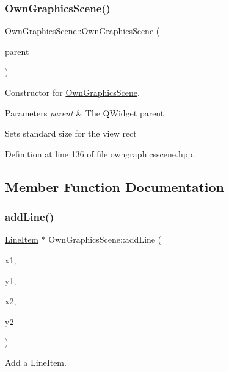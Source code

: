 \subsubsection{\texorpdfstring{Own\+Graphics\+Scene()}{OwnGraphicsScene()}}
{\footnotesize\ttfamily Own\+Graphics\+Scene\+::\+Own\+Graphics\+Scene (\begin{DoxyParamCaption}\item[{Q\+Widget $\ast$}]{parent }\end{DoxyParamCaption})\hspace{0.3cm}{\ttfamily [inline]}}



Constructor for \mbox{\hyperlink{classOwnGraphicsScene}{Own\+Graphics\+Scene}}. 


\begin{DoxyParams}{Parameters}
{\em parent} & The Q\+Widget parent\\
\hline
\end{DoxyParams}
Sets standard size for the view rect 

Definition at line 136 of file owngraphicsscene.\+hpp.



\subsection{Member Function Documentation}
\mbox{\label{classOwnGraphicsScene_a4251b836ee575083f4eeaa73254723f4}} 
\subsubsection{\texorpdfstring{add\+Line()}{addLine()}}
{\footnotesize\ttfamily \mbox{\hyperlink{classLineItem}{Line\+Item}} $\ast$ Own\+Graphics\+Scene\+::add\+Line (\begin{DoxyParamCaption}\item[{unsigned}]{x1,  }\item[{unsigned}]{y1,  }\item[{unsigned}]{x2,  }\item[{unsigned}]{y2 }\end{DoxyParamCaption})}



Add a \mbox{\hyperlink{classLineItem}{Line\+Item}}. 


